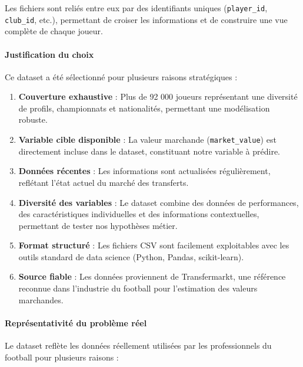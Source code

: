 \documentclass[12pt,a4paper]{article}
\begin{document}
Les fichiers sont reliés entre eux par des identifiants uniques (\texttt{player\_id}, \texttt{club\_id}, etc.), permettant de croiser les informations et de construire une vue complète de chaque joueur.

\paragraph{Justification du choix}

Ce dataset a été sélectionné pour plusieurs raisons stratégiques :

\begin{enumerate}[leftmargin=*]
    \item \textbf{Couverture exhaustive} : Plus de 92 000 joueurs représentant une diversité de profils, championnats et nationalités, permettant une modélisation robuste.
    
    \item \textbf{Variable cible disponible} : La valeur marchande (\texttt{market\_value}) est directement incluse dans le dataset, constituant notre variable à prédire.
    
    \item \textbf{Données récentes} : Les informations sont actualisées régulièrement, reflétant l'état actuel du marché des transferts.
    
    \item \textbf{Diversité des variables} : Le dataset combine des données de performances, des caractéristiques individuelles et des informations contextuelles, permettant de tester nos hypothèses métier.
    
    \item \textbf{Format structuré} : Les fichiers CSV sont facilement exploitables avec les outils standard de data science (Python, Pandas, scikit-learn).
    
    \item \textbf{Source fiable} : Les données proviennent de Transfermarkt, une référence reconnue dans l'industrie du football pour l'estimation des valeurs marchandes.
\end{enumerate}

\paragraph{Représentativité du problème réel}

Le dataset reflète les données réellement utilisées par les professionnels du football pour plusieurs raisons :
\end{document}
